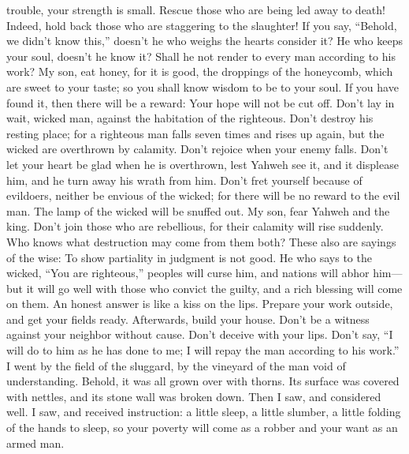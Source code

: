 trouble, your strength is small.  Rescue those who are
being led away to death! Indeed, hold back those who are staggering to
the slaughter!  If you say, ``Behold, we didn't know
this,'' doesn't he who weighs the hearts consider it? He who keeps your
soul, doesn't he know it? Shall he not render to every man according to
his work?  My son, eat honey, for it is good, the droppings
of the honeycomb, which are sweet to your taste;  so you
shall know wisdom to be to your soul. If you have found it, then there
will be a reward: Your hope will not be cut off.  Don't lay
in wait, wicked man, against the habitation of the righteous. Don't
destroy his resting place;  for a righteous man falls seven
times and rises up again, but the wicked are overthrown by calamity.
 Don't rejoice when your enemy falls. Don't let your heart
be glad when he is overthrown,  lest Yahweh see it, and it
displease him, and he turn away his wrath from him.  Don't
fret yourself because of evildoers, neither be envious of the wicked;
 for there will be no reward to the evil man. The lamp of
the wicked will be snuffed out.  My son, fear Yahweh and
the king. Don't join those who are rebellious,  for their
calamity will rise suddenly. Who knows what destruction may come from
them both?  These also are sayings of the wise: To show
partiality in judgment is not good.  He who says to the
wicked, ``You are righteous,'' peoples will curse him, and nations will
abhor him---  but it will go well with those who convict
the guilty, and a rich blessing will come on them.  An
honest answer is like a kiss on the lips.  Prepare your
work outside, and get your fields ready. Afterwards, build your house.
 Don't be a witness against your neighbor without cause.
Don't deceive with your lips.  Don't say, ``I will do to
him as he has done to me; I will repay the man according to his work.''
 I went by the field of the sluggard, by the vineyard of
the man void of understanding.  Behold, it was all grown
over with thorns. Its surface was covered with nettles, and its stone
wall was broken down.  Then I saw, and considered well. I
saw, and received instruction:  a little sleep, a little
slumber, a little folding of the hands to sleep,  so your
poverty will come as a robber and your want as an armed man.

